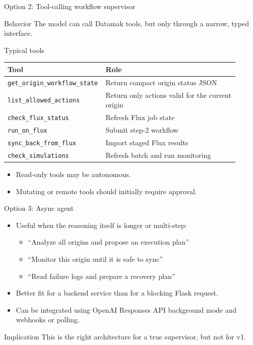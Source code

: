 \documentclass[aspectratio=169,11pt]{beamer}
\newcommand{\code}[1]{\texttt{#1}}
\begin{document}
\begin{frame}{Option 2: Tool-calling workflow supervisor}
  \begin{block}{Behavior}
    The model can call Datamak tools, but only through a narrow, typed
    interface.
  \end{block}

  \begin{block}{Typical tools}
    \scriptsize
    \begin{tabular}{>{\raggedright\arraybackslash}p{0.33\linewidth}>{\raggedright\arraybackslash}p{0.58\linewidth}}
      \toprule
      \textbf{Tool} & \textbf{Role} \\
      \midrule
      \code{get\_origin\_workflow\_state} & Return compact origin status JSON \\
      \code{list\_allowed\_actions} & Return only actions valid for the current origin \\
      \code{check\_flux\_status} & Refresh Flux job state \\
      \code{run\_on\_flux} & Submit step-2 workflow \\
      \code{sync\_back\_from\_flux} & Import staged Flux results \\
      \code{check\_simulations} & Refresh batch and run monitoring \\
      \bottomrule
    \end{tabular}
    \normalsize
  \end{block}

  \begin{itemize}
    \item Read-only tools may be autonomous.
    \item Mutating or remote tools should initially require approval.
  \end{itemize}
\end{frame}

\begin{frame}{Option 3: Async agent}
  \begin{itemize}
    \item Useful when the reasoning itself is longer or multi-step:
    \begin{itemize}
      \item ``Analyze all origins and propose an execution plan''
      \item ``Monitor this origin until it is safe to sync''
      \item ``Read failure logs and prepare a recovery plan''
    \end{itemize}
    \item Better fit for a backend service than for a blocking Flask request.
    \item Can be integrated using OpenAI Responses API background mode and
    webhooks or polling.
  \end{itemize}

  \begin{block}{Implication}
    This is the right architecture for a true supervisor, but not for v1.
  \end{block}
\end{frame}
\end{document}

